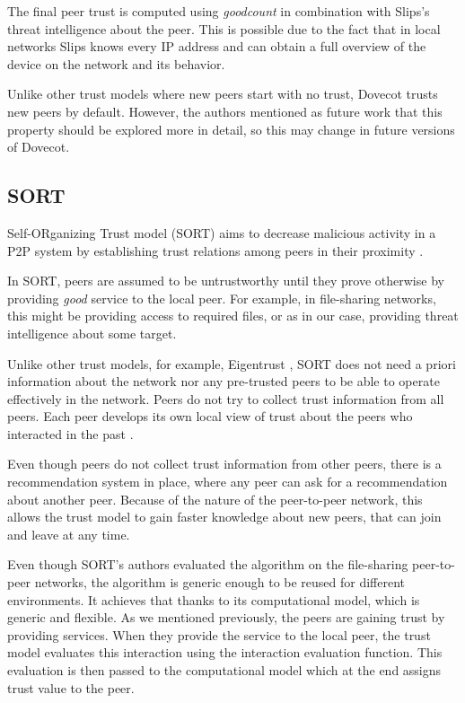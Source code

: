 The final peer trust is computed using \textit{goodcount} in combination with Slips's threat intelligence about the peer. 
This is possible due to the fact that in local networks Slips knows every IP address and can obtain a full overview of the device on the network and its behavior.

Unlike other trust models where new peers start with no trust, Dovecot trusts new peers by default. 
However, the authors mentioned as future work that this property should be explored more in detail, so this may change in future versions of Dovecot.

\subsection{SORT}
\label{subsec:sort}
Self-ORganizing Trust model (SORT) aims to decrease malicious activity in a P2P system by establishing trust relations among peers in their proximity \cite{sort}.

In SORT, peers are assumed to be untrustworthy until they prove otherwise by providing \textit{good} service to the local peer. 
For example, in file-sharing networks, this might be providing access to required files, or as in our case, providing threat intelligence about some target.

Unlike other trust models, for example, Eigentrust \cite{kamvar2003eigentrust}, SORT does not need a priori information about the network nor any pre-trusted peers to be able to operate effectively in the network.
Peers do not try to collect trust information from all peers.
Each peer develops its own local view of trust about the peers who interacted in the past \cite{sort}.

Even though peers do not collect trust information from other peers, there is a recommendation system in place, where any peer can ask for a recommendation about another peer.
Because of the nature of the peer-to-peer network, this allows the trust model to gain faster knowledge about new peers, that can join and leave at any time.

Even though SORT's authors evaluated the algorithm on the file-sharing peer-to-peer networks, the algorithm is generic enough to be reused for different environments.
It achieves that thanks to its computational model, which is generic and flexible.
As we mentioned previously, the peers are gaining trust by providing services. 
When they provide the service to the local peer, the trust model evaluates this interaction using the interaction evaluation function.
This evaluation is then passed to the computational model which at the end assigns trust value to the peer.

